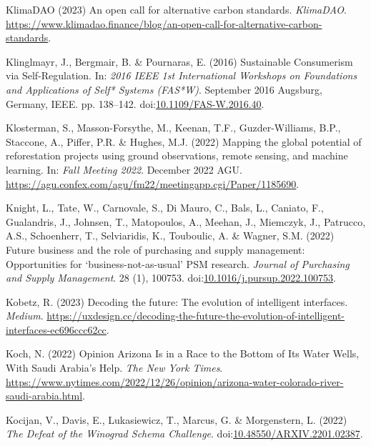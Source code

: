 \documentclass[
  letterpaper,
  DIV=11,
  numbers=noendperiod]{scrartcl}
\newlength{\cslhangindent}
\newenvironment{CSLReferences}[2] %
 {\begin{list}{}{%
  \setlength{\itemindent}{0pt}
  \setlength{\leftmargin}{0pt}
  \setlength{\parsep}{0pt}
  \ifodd #1
   \setlength{\leftmargin}{\cslhangindent}
   \setlength{\itemindent}{-1\cslhangindent}
  \fi
  \setlength{\itemsep}{#2\baselineskip}}}
 {\end{list}}
\begin{document}
\begin{CSLReferences}{0}{1}
KlimaDAO (2023) An open call for alternative carbon standards.
\emph{KlimaDAO}.
\url{https://www.klimadao.finance/blog/an-open-call-for-alternative-carbon-standards}.

Klinglmayr, J., Bergmair, B. \& Pournaras, E. (2016) Sustainable
{Consumerism} via {Self-Regulation}. In: \emph{2016 {IEEE} 1st
{International Workshops} on {Foundations} and {Applications} of {Self}*
{Systems} ({FAS}*{W})}. September 2016 Augsburg, Germany, IEEE. pp.
138--142.
doi:\href{https://doi.org/10.1109/FAS-W.2016.40}{10.1109/FAS-W.2016.40}.

Klosterman, S., Masson-Forsythe, M., Keenan, T.F., Guzder-Williams,
B.P., Staccone, A., Piffer, P.R. \& Hughes, M.J. (2022) Mapping the
global potential of reforestation projects using ground observations,
remote sensing, and machine learning. In: \emph{Fall {Meeting} 2022}.
December 2022 AGU.
\url{https://agu.confex.com/agu/fm22/meetingapp.cgi/Paper/1185690}.

Knight, L., Tate, W., Carnovale, S., Di Mauro, C., Bals, L., Caniato,
F., Gualandris, J., Johnsen, T., Matopoulos, A., Meehan, J., Miemczyk,
J., Patrucco, A.S., Schoenherr, T., Selviaridis, K., Touboulic, A. \&
Wagner, S.M. (2022) Future business and the role of purchasing and
supply management: {Opportunities} for {`business-not-as-usual'} {PSM}
research. \emph{Journal of Purchasing and Supply Management}. 28 (1),
100753.
doi:\href{https://doi.org/10.1016/j.pursup.2022.100753}{10.1016/j.pursup.2022.100753}.

Kobetz, R. (2023) Decoding the future: The evolution of intelligent
interfaces. \emph{Medium}.
\url{https://uxdesign.cc/decoding-the-future-the-evolution-of-intelligent-interfaces-ec696ccc62cc}.

Koch, N. (2022) Opinion {\textbar} {Arizona Is} in a {Race} to the
{Bottom} of {Its Water Wells}, {With Saudi Arabia}'s {Help}. \emph{The
New York Times}.
\url{https://www.nytimes.com/2022/12/26/opinion/arizona-water-colorado-river-saudi-arabia.html}.

Kocijan, V., Davis, E., Lukasiewicz, T., Marcus, G. \& Morgenstern, L.
(2022) \emph{The {Defeat} of the {Winograd Schema Challenge}}.
doi:\href{https://doi.org/10.48550/ARXIV.2201.02387}{10.48550/ARXIV.2201.02387}.


\end{CSLReferences}
\end{document}

